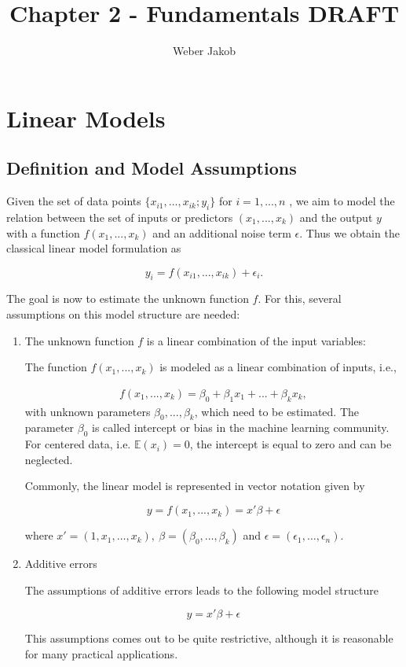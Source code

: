 \documentclass[10pt,a4paper]{article}
\title{Chapter 2 - Fundamentals DRAFT}
\author{Weber Jakob}
\begin{document}
	\maketitle
	
	\section{Linear Models} \label{LinModel}
		
	\subsection{Definition and Model Assumptions}
	
	Given the set of data points $\{x_{i1}, ..., x_{ik}; y_i \}$ for $i = 1, ..., n$ , we aim to model the relation between the set of inputs or predictors $(x_1, ..., x_k)$ and the output $y$ with a function $f(x_1, ..., x_k)$ and an additional noise term $\epsilon$. Thus we obtain the classical linear model formulation as
	
	$$y_i = f(x_{i1}, ..., x_{ik}) + \epsilon_i.$$
	
	The goal is now to estimate the unknown function $f$. For this, several assumptions on this model structure are needed:
	
	\begin{enumerate}
		\item The unknown function $f$ is a linear combination of the input variables:
		
		The function $f(x_1, ..., x_k)$ is modeled as a linear combination of inputs, i.e.,
		
		\begin{align} \label{linCombOfInputs}
			f(x_1, ..., x_k) = \beta_0 + \beta_1 x_1 + ... + \beta_k x_k,
		\end{align}
		with unknown parameters $\beta_0, ..., \beta_k$, which need to be estimated. The parameter $\beta_0$ is called intercept or bias in the machine learning community. For centered data, i.e. $\mathbb{E}(x_i) = 0$, the intercept is equal to zero and can be neglected.
		
		Commonly, the linear model is represented in vector notation  given by
		
		$$ y = f(x_1, ..., x_k)  = x' \beta + \epsilon $$
		
		where $x' = (1, x_1, \dots, x_k), \ \beta = (\beta_0, \dots, \beta_k)$ and $\epsilon = (\epsilon_1, \dots, \epsilon_n)$.
		
		\item Additive errors
		
		The assumptions of additive errors leads to the following model structure
		
		$$y = x'\beta + \epsilon$$
		
		This assumptions comes out to be quite restrictive, although it is reasonable for many practical applications.
	\end{enumerate}
	
\end{document}
